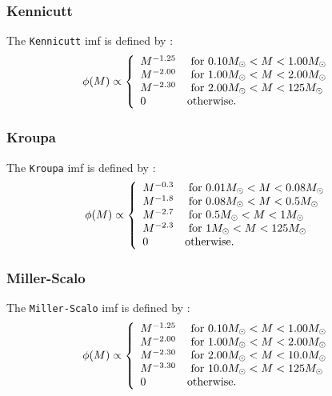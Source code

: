 \subsubsection{Kennicutt}

The {\tt Kennicutt} \gls{imf} is defined by \citep{kennicutt_rate_1983}:
\begin{equation}
 \phi(M) \propto \left\{ \begin{array}{ll}
 M^{-1.25} & \hbox{ for } 0.10M_\odot < M < 1.00M_\odot \\
 M^{-2.00} & \hbox{ for } 1.00M_\odot < M < 2.00M_\odot \\
 M^{-2.30} & \hbox{ for } 2.00M_\odot < M < 125M_\odot \\
 0 & \hbox {otherwise.} \end{array} \right.
\end{equation}

\subsubsection{Kroupa}

The {\tt Kroupa} \gls{imf} is defined by \citep{kroupa_variation_2001}:
\begin{equation}
 \phi(M) \propto \left\{ \begin{array}{ll}
 M^{-0.3} & \hbox{ for } 0.01M_\odot < M < 0.08M_\odot \\ 
 M^{-1.8} & \hbox{ for } 0.08M_\odot < M < 0.5M_\odot \\ 
 M^{-2.7} & \hbox{ for } 0.5M_\odot < M < 1M_\odot \\ 
 M^{-2.3} & \hbox{ for } 1M_\odot < M < 125M_\odot \\ 
0 & \hbox {otherwise.} \end{array} \right.
\end{equation}

\subsubsection{Miller-Scalo}

The {\tt Miller-Scalo} \gls{imf} is defined by \citep{miller_initial_1979}:
\begin{equation}
 \phi(M) \propto \left\{ \begin{array}{ll}
 M^{-1.25} & \hbox{ for } 0.10M_\odot < M < 1.00M_\odot \\
 M^{-2.00} & \hbox{ for } 1.00M_\odot < M < 2.00M_\odot \\
 M^{-2.30} & \hbox{ for } 2.00M_\odot < M < 10.0M_\odot \\
 M^{-3.30} & \hbox{ for } 10.0M_\odot < M < 125M_\odot \\
 0 & \hbox {otherwise.} \end{array} \right.
\end{equation}

